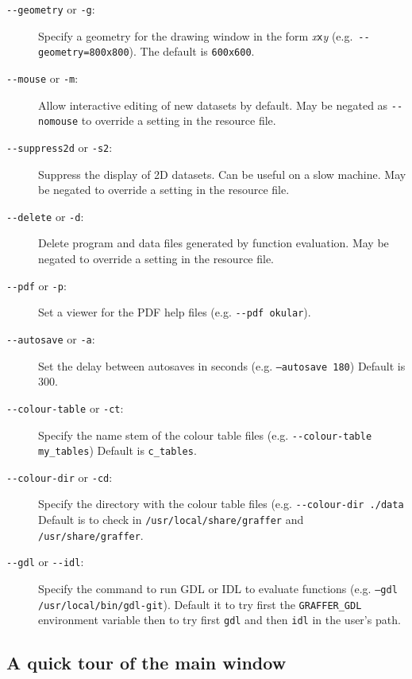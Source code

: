 \documentclass[11pt,twoside,english]{article}
\begin{document}
\begin{description}

\item [\texttt{-{}-geometry} or \texttt{-g}:] Specify a geometry for the
  drawing window in the form \textit{x}\texttt{x}\textit{y} (e.g.\
  \texttt{-{}-geometry=800x800}). The default is \texttt{600x600}.
\item[\texttt{-{}-mouse} or \texttt{-m}:] Allow interactive editing of
  new datasets  by default. May be negated as \texttt{-{}-nomouse} to
  override a setting in the resource file.
\item[\texttt{-{}-suppress\-2d} or \texttt{-s2}:] Suppress the display
  of 2D datasets. Can be useful on a slow machine. May be negated to
  override a setting in the resource file.
\item[\texttt{-{}-delete} or \texttt{-d}:] Delete program and data
  files generated by function evaluation. May be negated to override
  a setting in  the resource file.
\item[\texttt{-{}-pdf} or \texttt{-p}:] Set a viewer for the PDF help
  files (e.g. \texttt{-{}-pdf okular}).
\item[\texttt{-{}-autosave} or \texttt{-a}:] Set the delay between
  autosaves in seconds (e.g. \texttt{--autosave 180}) Default is 300.
\item[\texttt{-{}-colour-table} or \texttt{-ct}:] Specify the name stem
  of the colour table files (e.g. \texttt{-{}-colour-table my\_tables})
  Default is \texttt{c\_tables}.
\item[\texttt{-{}-colour-dir} or \texttt{-cd}:] Specify the directory
  with the colour table files (e.g. \texttt{-{}-colour-dir ./data}
  Default is to check in \texttt{/usr/local/share/graffer} and
  \texttt{/usr/share/graffer}. 
\item[\texttt{-{}-gdl} or \texttt{-{}-idl}:]
  Specify the command to run GDL or IDL to evaluate functions
  (e.g. \texttt{--gdl /usr/local/bin/gdl-git}). Default it to try first
  the \texttt{GRAFFER\_GDL} environment variable then to try first
  \texttt{gdl} and then \texttt{idl} in the user's path.
\end{description}

\subsection{A quick tour of the main window}
\end{document}
